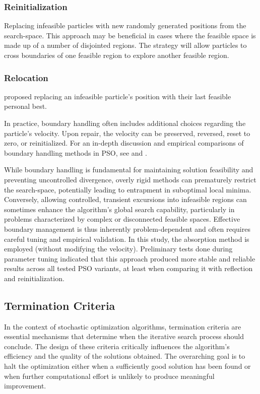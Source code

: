 {\subsubsection{Reinitialization}
    Replacing infeasible particles with new randomly generated positions from the \gls{search-space}. This approach may be beneficial in cases where the feasible space is made up of a number of disjointed regions. The strategy will allow particles to cross boundaries of one feasible region to explore another feasible region.
\subsubsection{Relocation}
     \citet{elgallad2002enhancing}  proposed replacing an infeasible particle’s position  with their last feasible personal best.

\vspace{.935em}


In practice, boundary handling often includes additional choices regarding the particle's velocity. Upon repair, the velocity can be preserved, reversed, reset to zero, or reinitialized. For an in-depth discussion and empirical comparisons of boundary handling methods in PSO, see \citep{chu2011handling} and \citep{padhye2013boundary}.

While boundary handling is fundamental for maintaining solution feasibility and preventing uncontrolled divergence, overly rigid methods can prematurely restrict the \gls{search-space}, potentially leading to entrapment in suboptimal local minima. Conversely, allowing controlled, transient excursions into infeasible regions can sometimes enhance the algorithm's global search capability, particularly in problems characterized by complex or disconnected feasible spaces. Effective boundary management is thus inherently problem-dependent and often requires careful tuning and empirical validation.
In this study, the absorption method is employed (without modifying the velocity). Preliminary tests done during parameter tuning indicated that this approach produced more stable and reliable results across all tested PSO variants, at least when comparing it with reflection and reinitialization.


\subsection{Termination Criteria}

In the context of stochastic optimization algorithms, termination criteria are essential mechanisms that determine when the iterative search process should conclude. The design of these criteria critically influences the algorithm’s efficiency and the quality of the solutions obtained. The overarching goal is to halt the optimization either when a sufficiently good solution has been found or when further computational effort is unlikely to produce meaningful improvement.

}

